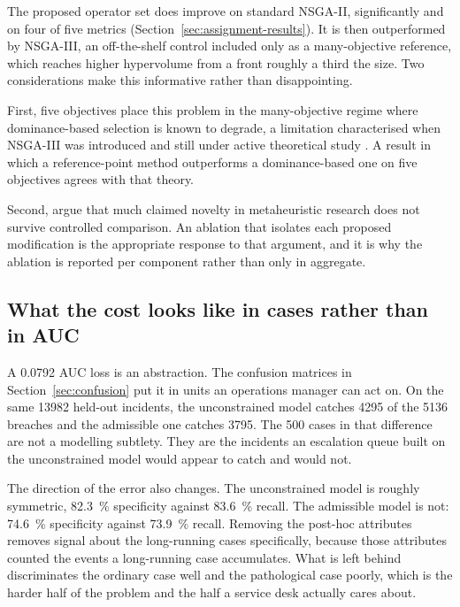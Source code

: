 The proposed operator set does improve on standard NSGA-II, significantly and on four of five
metrics (Section~\ref{sec:assignment-results}). It is then outperformed by NSGA-III, an
off-the-shelf control included only as a many-objective reference, which reaches higher
hypervolume from a front roughly a third the size. Two considerations make this informative
rather than disappointing.

First, five objectives place this problem in the many-objective regime where dominance-based
selection is known to degrade, a limitation characterised when NSGA-III was introduced
\citep{debjain2014evolutionary} and still under active theoretical study
\citep{zheng2024runtime,doerr2026difficulties}. A result in which a reference-point method
outperforms a dominance-based one on five objectives agrees with that theory.

Second, \citet{wang2025rethinking} argue that much claimed novelty in metaheuristic research
does not survive controlled comparison. An ablation that isolates each proposed modification
is the appropriate response to that argument, and it is why the ablation is reported per
component rather than only in aggregate.

\subsection{What the cost looks like in cases rather than in AUC}

A \num{0.0792} AUC loss is an abstraction. The confusion matrices in
Section~\ref{sec:confusion} put it in units an operations manager can act on. On the same
\num{13982} held-out incidents, the unconstrained model catches \num{4295} of the \num{5136}
breaches and the admissible one catches \num{3795}. The \num{500} cases in that difference are
not a modelling subtlety. They are the incidents an escalation queue built on the
unconstrained model would appear to catch and would not.

The direction of the error also changes. The unconstrained model is roughly symmetric,
\SI{82.3}{\percent} specificity against \SI{83.6}{\percent} recall. The admissible model is
not: \SI{74.6}{\percent} specificity against \SI{73.9}{\percent} recall. Removing the
post-hoc attributes removes signal about the long-running cases specifically, because those
attributes counted the events a long-running case accumulates. What is left behind
discriminates the ordinary case well and the pathological case poorly, which is the harder
half of the problem and the half a service desk actually cares about.

